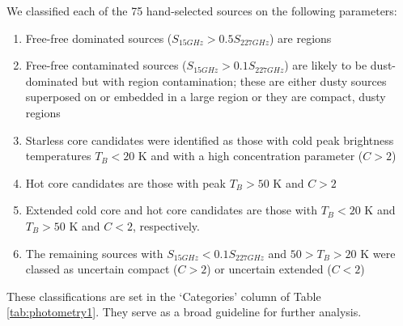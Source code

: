 \documentclass{emulateapj}
\begin{document}
We classified each of the 75 hand-selected sources on the following parameters:
\begin{enumerate}
    \item Free-free dominated sources ($S_{15 GHz} > 0.5 S_{227 GHz}$) are \hii
        regions
    \item Free-free contaminated sources ($S_{15 GHz} > 0.1 S_{227 GHz}$) are
        likely to be dust-dominated but with \hii region contamination; these
        are either dusty sources superposed on or embedded in a large \hii
        region or they are compact, dusty \hii regions
    \item Starless core candidates were identified as those with cold peak
        brightness temperatures $T_B < 20$ K and with a high concentration
        parameter ($C>2$)
    \item Hot core candidates are those with peak $T_B>50$ K and $C>2$
    \item Extended cold core and hot core candidates are those with $T_B<20$ K
        and $T_B>50$ K and $C<2$, respectively.
    \item The remaining sources with $S_{15 GHz} < 0.1 S_{227 GHz}$ and $50 >
        T_B > 20$ K were classed as uncertain compact ($C>2$) or uncertain extended
        ($C<2$)
\end{enumerate}

These classifications are set in the `Categories' column of Table
\ref{tab:photometry1}.  They serve as a broad guideline for further
analysis.   


\end{document}
